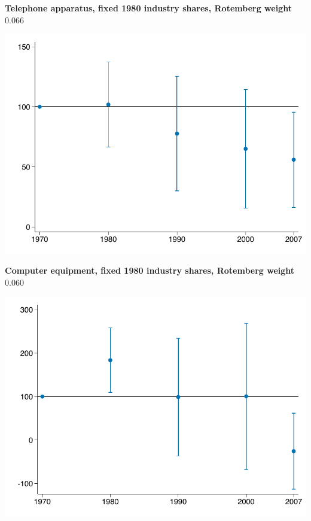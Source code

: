 \documentclass[notes,11pt, aspectratio=169]{beamer}
\begin{document}

\begin{frame}[label=ind3661_gr1980]
\addtocounter{framenumber}{-1}
\textbf{Telephone apparatus, fixed 1980 industry shares, Rotemberg weight $0.066 $}


\begin{center}
		\includegraphics[scale=0.730]{images/share_emp_ind_bhj_3661_pre_trends_index1980.pdf}
\end{center}




\end{frame}




\begin{frame}[label=ind3577_gr1980]
\addtocounter{framenumber}{-1}
\textbf{Computer equipment, fixed 1980 industry shares, Rotemberg weight $0.060 $}


\begin{center}
		\includegraphics[scale=0.730]{images/share_emp_ind_bhj_3577_pre_trends_index1980.pdf}
\end{center}




\end{frame}
\end{document}
